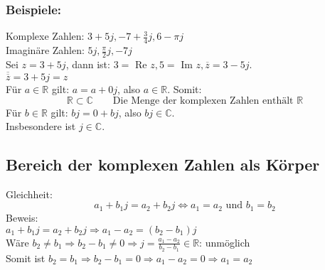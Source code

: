 \subsubsection{Beispiele:}
Komplexe Zahlen: $3 + 5 j, -7 + \frac{3}{4} j, 6 - \pi j$\\
Imaginäre Zahlen: $5 j, \frac{\pi}{2} j, -7 j$\\
Sei $z = 3 + 5 j$, dann ist: $3 =$ Re $z, 5 =$ Im $z, \overline{z} = 3 - 5 j$. \\
$\overline{\overline{z}} = 3 + 5 j = z$\\
Für $a \in \mathbb{R}$ gilt: $a = a + 0 j$, also $a \in \mathbb{R}$. Somit: 
\[ \boxed{\mathbb{R} \subset \mathbb{C}} \qquad \text{Die Menge der komplexen Zahlen enthält $\mathbb{R}$} \]
Für $b \in \mathbb{R}$ gilt: $b j = 0 + b j$, also $b j \in \mathbb{C}$. \\
Insbesondere ist $j \in \mathbb{C}$. 

\subsection{Bereich der komplexen Zahlen als Körper}
Gleichheit: 
\[ \boxed{a_1 + b_1 j = a_2 + b_2 j \Leftrightarrow a_1 = a_2\text{ und }b_1 = b_2} \]
Beweis: \\
$a_1 + b_1 j = a_2 + b_2 j \Rightarrow a_1 - a_2 = (b_2 - b_1) j$\\
Wäre $b_2 \neq b_1 \Rightarrow b_2 - b_1 \neq 0 \Rightarrow j = \frac{a_1 - a_2}{b_2 - b_1} \in \mathbb{R}$: unmöglich\\
Somit ist $b_2 = b_1 \Rightarrow b_2 - b_1 = 0 \Rightarrow a_1 - a_2 = 0 \Rightarrow a_1 = a_2$